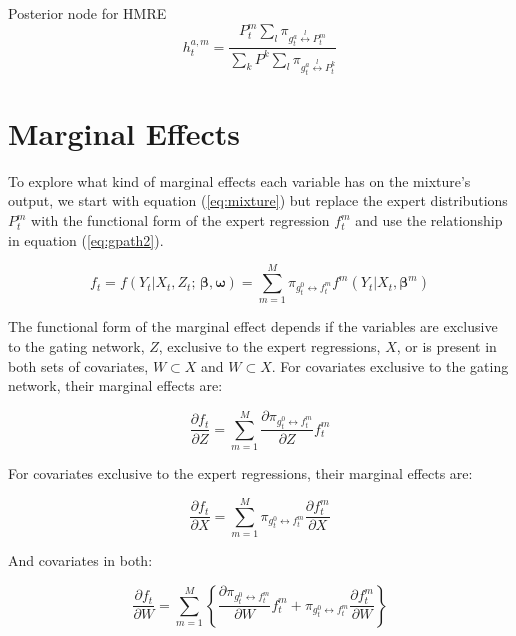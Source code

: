 \documentclass[12pt]{article}
\newcommand{\gateprod}[2]{\pi_{#1 \longleftrightarrow #2}}
\newcommand{\sumgateprod}[3]{\pi_{#1 \overset{#3}{\longleftrightarrow} #2}}
\newcommand{\shortsum}[1]{\sum \nolimits_{#1}}
\begin{document}
Posterior node for HMRE
\begin{equation} 
  h^{a,m}_{t} = \frac{P^{m}_{t} \shortsum{l} \sumgateprod{g^{a}_{t}}{P^{m}_{t}}{l}}{\sum_{k} P^{k} \shortsum{l} \sumgateprod{g^{a}_{t}}{P^{k}_{t}}{l}}
\end{equation}



\section{Marginal Effects} \label{sec:MarginalEffects}

To explore what kind of marginal effects each variable has on the mixture's 
output, we start with equation (\ref{eq:mixture}) but replace the
expert distributions $P^{m}_{t}$ with the functional form of the 
expert regression $f^{m}_{t}$ and use the relationship in equation
(\ref{eq:gpath2}). 

\begin{equation} \label{eq:mixture2}
  f_{t} = f(Y_{t} | X_{t}, Z_{t}; \, \boldsymbol{\beta}, \boldsymbol{\omega}) = \sum_{m=1}^{M} \gateprod{g^{0}_{t}}{f^{m}_{t}} f^{m}(Y_{t} | X_{t}, \boldsymbol{\beta}^{m})
\end{equation}

The functional form of the marginal effect depends if the variables are
exclusive to the gating network, $Z$, exclusive to the expert
regressions, $X$, or is present in both sets of covariates,
$W \subset X$ and $W \subset X$. For covariates
exclusive to the gating network, their marginal effects are:

\begin{equation} \label{eq:ME_gating}
  \frac{\partial f_{t}}{\partial Z} = \sum_{m=1}^{M} \frac{\partial \gateprod{g^{0}_{t}}{f^{m}_{t}}}{{\partial Z}}f^{m}_{t}
\end{equation}

For covariates exclusive to the expert regressions, their marginal effects
are:

\begin{equation} \label{eq:ME_expert}
  \frac{\partial f_{t}}{\partial X} = \sum_{m=1}^{M} \gateprod{g^{0}_{t}}{f^{m}_{t}} \frac{\partial f^{m}_{t}}{{\partial X}}
\end{equation}

And covariates in both:

\begin{equation} \label{eq:ME_both}
  \frac{\partial f_{t}}{\partial W} = \sum_{m=1}^{M} \left\{ \frac{\partial \gateprod{g^{0}_{t}}{f^{m}_{t}}}{{\partial W}}f^{m}_{t} + \gateprod{g^{0}_{t}}{f^{m}_{t}} \frac{\partial f^{m}_{t}}{{\partial W}} \right\}
\end{equation}
\end{document}
